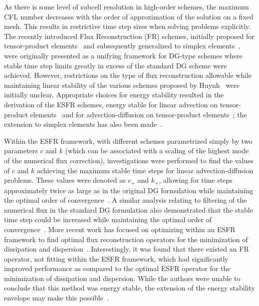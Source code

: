 \documentclass[12pt,Bold,letterpaper,TexShade]{mcgilletdclass}
\numberwithin{equation}{section}
\begin{document}
As there is some level of subcell resolution in high-order schemes, the maximum CFL number decreases with the order of approximation of the solution on a fixed mesh. This results in restrictive time step sizes when solving problems explicitly. The recently introduced Flux Reconstruction (FR) schemes, initially proposed for tensor-product elements~\cite{huynh2007} and subsequently generalized to simplex elements~\cite{wang2009}, were originally presented as a unifying framework for DG-type schemes where stable time step limits greatly in excess of the standard DG scheme were achieved. However, restrictions on the type of flux reconstruction allowable while maintaining linear stability of the various schemes proposed by Huynh~\cite{huynh2007} were initially unclear. Appropriate choices for energy stability resulted in the derivation of the ESFR schemes, energy stable for linear advection on tensor-product elements~\cite{vincent2011} and for advection-diffusion on tensor-product elements~\cite{castonguay2013}; the extension to simplex elements has also been made~\cite{castonguay2012,williams2013,williams2014a}.

Within the ESFR framework, with different schemes parametrized simply by two parameters $c$ and $k$ (which can be associated with a scaling of the highest mode of the numerical flux correction), investigations were performed to find the values of $c$ and $k$ achieving the maximum stable time steps for linear advection-diffusion problems. These values were denoted as $c_+$ and $k_+$, allowing for time steps approximately twice as large as in the original DG formulation while maintaining the optimal order of convergence~\cite{castonguay2013,castonguay2012,williams2013,williams2014a}. A similar analysis relating to filtering of the numerical flux in the standard DG formulation also demonstrated that the stable time step could be increased while maintaining the optimal order of convergence~\cite{chalmers2014}. More recent work has focused on optimizing within an ESFR framework to find optimal flux reconstruction operators for the minimization of dissipation and dispersion~\cite{asthana2014}. Interestingly, it was found that there existed an FR operator, not fitting within the ESFR framework, which had significantly improved performance as compared to the optimal ESFR operator for the minimization of dissipation and dispersion. While the authors were unable to conclude that this method was energy stable, the extension of the energy stability envelope may make this possible~\cite{vincent2015}.
\end{document}
